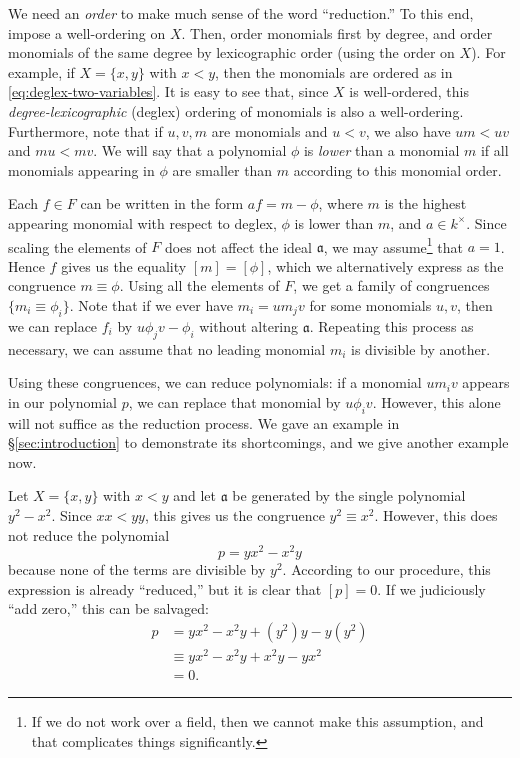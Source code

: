 We need an \emph{order} to make much sense of the word ``reduction.'' To this end, impose a well-ordering on $X$. Then, order monomials first by degree, and order monomials of the same degree by lexicographic order (using the order on $X$). For example, if $X = \{x,y\}$ with $x < y$, then the monomials are ordered as in \eqref{eq:deglex-two-variables}.
It is easy to see that, since $X$ is well-ordered, this \emph{degree-lexicographic} (deglex) ordering of monomials is also a well-ordering. Furthermore, note that if $u,v,m$ are monomials and $u < v$, we also have $um < uv$ and $mu < mv$. We will say that a polynomial $\phi$ is \emph{lower} than a monomial $m$ if all monomials appearing in $\phi$ are smaller than $m$ according to this monomial order.

Each $f \in F$ can be written in the form $a f = m - \phi$, where $m$ is the highest appearing monomial with respect to deglex, $\phi$ is lower than $m$, and $a \in k^\times$. Since scaling the elements of $F$ does not affect the ideal $\mathfrak{a}$, we may assume\footnote{If we do not work over a field, then we cannot make this assumption, and that complicates things significantly.} that $a = 1$. Hence $f$ gives us the equality $[m] = [\phi]$, which we alternatively express as the congruence $m \equiv \phi$. Using all the elements of $F$, we get a family of congruences $\{ m_i \equiv \phi_i \}$. Note that if we ever have $m_i = um_jv$ for some monomials $u,v$, then we can replace $f_i$ by $u\phi_j v - \phi_i$ without altering $\mathfrak{a}$. Repeating this process as necessary, we can assume that no leading monomial $m_i$ is divisible by another.

Using these congruences, we can reduce polynomials: if a monomial $u m_i v$ appears in our polynomial $p$, we can replace that monomial by $u \phi_i v$. However, this alone will not suffice as the reduction process. We gave an example in \S\ref{sec:introduction} to demonstrate its shortcomings, and we give another example now.

\begin{example}\label{exa:x2-y2}
	Let $X=\{x,y\}$ with $x < y$ and let $\mathfrak{a}$ be generated by the single polynomial $y^2 - x^2$. Since $xx < yy$, this gives us the congruence $y^2 \equiv x^2$. However, this does not reduce the polynomial
	\[
		p = yx^2 - x^2 y
	\]
	because none of the terms are divisible by $y^2$. According to our procedure, this expression is already ``reduced,'' but it is clear that $[p]=0$. If we judiciously ``add zero,'' this can be salvaged:
	\begin{align*}
		p &= yx^2 - x^2 y + (y^2)y - y(y^2)\\
		&\equiv yx^2 - x^2 y + x^2 y - y x^2\\
		&= 0.
	\end{align*}
\end{example}

